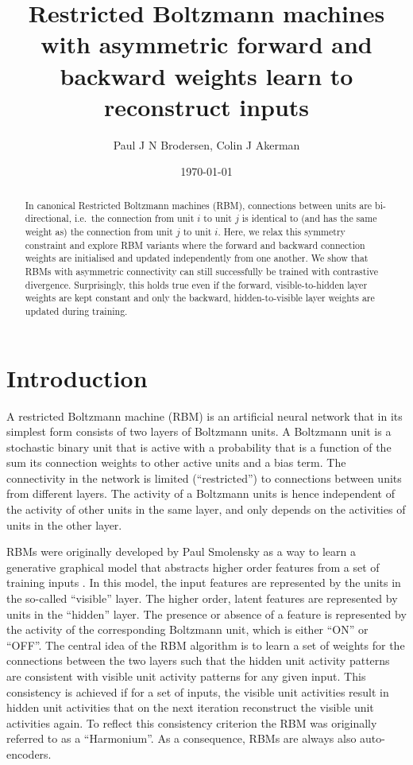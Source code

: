 \documentclass[11pt]{article}
\author{Paul J N Brodersen, Colin J Akerman}
\affil{Department of Pharmacology, University of Oxford}
\date{\today}
\title{Restricted Boltzmann machines with asymmetric forward and backward weights learn to reconstruct inputs}
\begin{document}
\maketitle
\linenumbers

\begin{abstract}
In canonical Restricted Boltzmann machines (RBM), connections between
units are bi-directional, i.e.\ the connection from unit $i$ to unit
$j$ is identical to (and has the same weight as) the connection from
unit $j$ to unit $i$. Here, we relax this symmetry constraint and
explore RBM variants where the forward and backward connection weights
are initialised and updated independently from one another. We show
that RBMs with asymmetric connectivity can still successfully be
trained with contrastive divergence. Surprisingly, this holds true
even if the forward, visible-to-hidden layer weights are kept constant
and only the backward, hidden-to-visible layer weights are updated
during training.
\end{abstract}

\section{Introduction}

A restricted Boltzmann machine (RBM) is an artificial neural network
that in its simplest form consists of two layers of Boltzmann units.
A Boltzmann unit is a stochastic binary unit that is active with a
probability that is a function of the sum its connection weights to
other active units and a bias term. The connectivity in the network
is limited (``restricted'') to connections between units from different
layers. The activity of a Boltzmann units is hence independent of the
activity of other units in the same layer, and only depends on the
activities of units in the other layer.

RBMs were originally developed by Paul Smolensky as a way to learn a
generative graphical model that abstracts higher order features from a
set of training inputs \citep{Smolensky1986a}. In this model, the input
features are represented by the units in the so-called ``visible''
layer. The higher order, latent features are represented by units in
the ``hidden'' layer. The presence or absence of a feature is
represented by the activity of the corresponding Boltzmann unit, which
is either ``ON'' or ``OFF''. The central idea of the RBM algorithm is
to learn a set of weights for the connections between the two layers
such that the hidden unit activity patterns are consistent with
visible unit activity patterns for any given input. This consistency
is achieved if for a set of inputs, the visible unit activities result
in hidden unit activities that on the next iteration reconstruct the
visible unit activities again. To reflect this consistency criterion
the RBM was originally referred to as a ``Harmonium''. As a
consequence, RBMs are always also auto-encoders.
\end{document}
